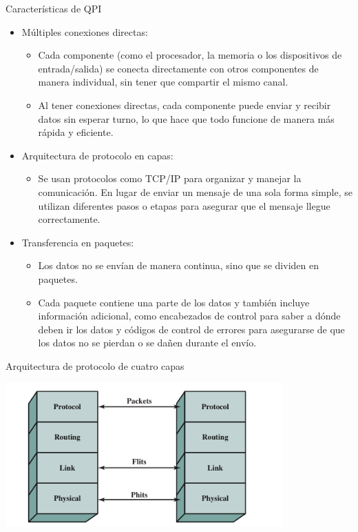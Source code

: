 \documentclass[presentation]{beamer}
\begin{document}
\begin{frame}[label={sec:org30a5800}]{Características de QPI}
\begin{itemize}
\item \alert{\alert{Múltiples conexiones directas:}}
\begin{itemize}
\item Cada componente (como el procesador, la memoria o los dispositivos de entrada/salida) se conecta
directamente con otros componentes de manera individual, sin tener que compartir el mismo canal.
\item Al tener conexiones directas, cada componente puede enviar y recibir datos sin esperar turno,
lo que hace que todo funcione de manera más rápida y eficiente.
\end{itemize}
\item \alert{\alert{Arquitectura de protocolo en capas:}}
\begin{itemize}
\item Se usan protocolos como TCP/IP para organizar y manejar la comunicación. En lugar de enviar
un mensaje de una sola forma simple, se utilizan diferentes pasos o etapas para asegurar que el
mensaje llegue correctamente.
\end{itemize}
\item \alert{\alert{Transferencia en paquetes:}}
\begin{itemize}
\item Los datos no se envían de manera continua, sino que se dividen en paquetes.
\item Cada paquete contiene una parte de los datos y también incluye información adicional, como encabezados
de control para saber a dónde deben ir los datos y códigos de control de errores para asegurarse de que
los datos no se pierdan o se dañen durante el envío.
\end{itemize}
\end{itemize}

\begin{block}{Arquitectura de protocolo de cuatro capas}
\begin{center}
\includegraphics[width=0.8\textwidth]{./Images/QPI.png}
\end{center}
\end{block}
\end{frame}
\end{document}
